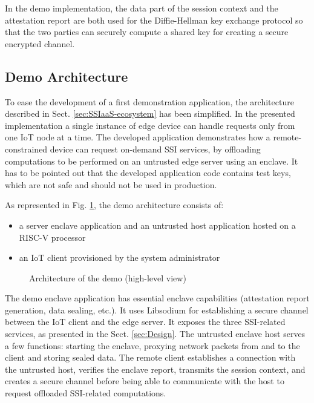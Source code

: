 In the demo implementation, the data part of the session context and the attestation report are both used for the Diffie-Hellman key exchange protocol so that the two parties can securely compute a shared key for creating a secure encrypted channel. 

\subsection{Demo Architecture}
\label{sect:demo-architecture}
To ease the development of a first demonstration application, the architecture described in Sect. \ref{sec:SSIaaS-ecosystem} has been simplified. In the presented implementation a single instance of edge device can handle requests only from one IoT node at a time. The developed application demonstrates how a remote-constrained device can request on-demand SSI services, by offloading computations to be performed on an untrusted edge server using an enclave. It has to be pointed out that the developed application code contains test keys, which are not safe and should not be used in production. 

As represented in Fig. \ref{poc-architecture-s}, the demo architecture consists of:
\begin{itemize}
    \item a server enclave application and an untrusted host application hosted on a RISC-V processor
    \item an IoT client provisioned by the system administrator  
\end{itemize} 

\begin{figure}[!h]
    \centering
    
    \caption{Architecture of the demo (high-level view) }
    \label{poc-architecture-s}
\end{figure}

The demo enclave application has essential enclave capabilities (attestation report generation, data sealing, etc.). It uses Libsodium \cite{libsodium} for establishing a secure channel between the IoT client and the edge server. It exposes the three SSI-related services, as presented in the Sect. \ref{sec:Design}. The untrusted enclave host serves a few functions: starting the enclave, proxying network packets from and to the client and storing sealed data. The remote client establishes a connection with the untrusted host, verifies the enclave report, transmits the session context, and creates a secure channel before being able to communicate with the host to request offloaded SSI-related computations.

